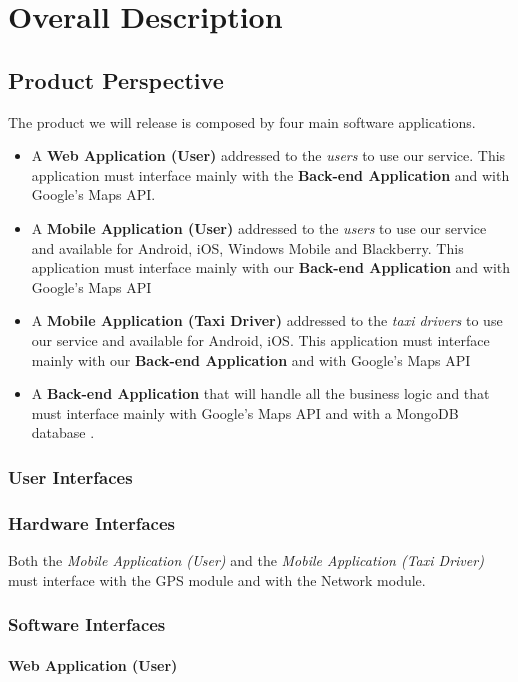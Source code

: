 \documentclass[12pt, a4paper]{article}
\begin{document}
\section{Overall Description}
\subsection{Product Perspective}

The product we will release is composed by four main software applications.
\begin{itemize}
  \item A \textbf{Web Application (User)} addressed to the \emph{users}  to use our service. This application must interface mainly with the \textbf{Back-end Application} and with Google's Maps API.
  \item A \textbf{Mobile Application (User)} addressed to the \emph{users} to use our service and available for Android, iOS, Windows Mobile and Blackberry. This application must interface mainly with our \textbf{Back-end Application} and with Google's Maps API
  \item A \textbf{Mobile Application (Taxi Driver)} addressed to the \emph{taxi drivers} to use our service and available for Android, iOS. This application must interface mainly with our \textbf{Back-end Application} and with Google's Maps API

  \item A \textbf{Back-end Application} that will handle all the business logic and that must interface mainly with Google's Maps API and with a MongoDB database .
\end{itemize}

\subsubsection{User Interfaces}
\subsubsection{Hardware Interfaces}
Both the \emph{Mobile Application (User)} and the \emph{Mobile Application (Taxi Driver)} must interface with the GPS module and with the Network module.\\

\subsubsection{Software Interfaces}


\paragraph{Web Application (User)} 
\end{document}
